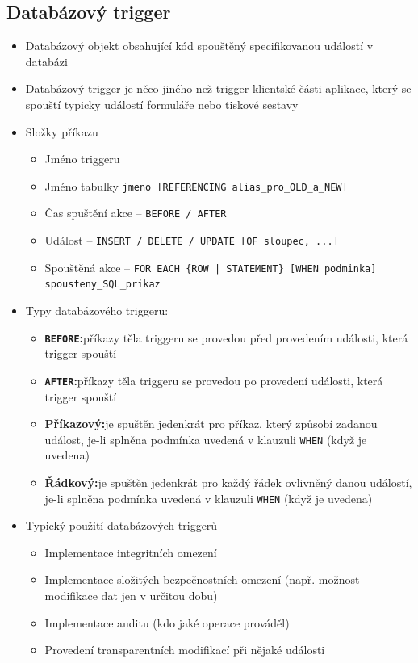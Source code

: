 \documentclass[a4paper,10pt]{article}
\newcommand{\pojem}[2]{\item \textbf{#1:}\quad #2}
\begin{document}
		\subsection{Databázový trigger}
			\begin{itemize}
				\item Databázový objekt obsahující kód spouštěný specifikovanou událostí v databázi
				\item Databázový trigger je něco jiného než trigger klientské části aplikace, který se spouští typicky událostí formuláře nebo tiskové sestavy
				\item Složky příkazu
				\begin{itemize}
					\item Jméno triggeru
					\item Jméno tabulky \texttt{jmeno [REFERENCING alias\_pro\_OLD\_a\_NEW]}
					\item Čas spuštění akce -- \texttt{BEFORE / AFTER}
					\item Událost -- \texttt{INSERT / DELETE / UPDATE [OF sloupec, ...]}
					\item Spouštěná akce -- \texttt{FOR EACH \{ROW | STATEMENT\} [WHEN podminka] spousteny\_SQL\_prikaz}
				\end{itemize}
				\item Typy databázového triggeru:
				\begin{itemize}
					\pojem{\texttt{BEFORE}}{příkazy těla triggeru se provedou před provedením události, která trigger spouští}
					\pojem{\texttt{AFTER}}{příkazy těla triggeru se provedou po provedení události, která trigger spouští}
					\pojem{Příkazový}{je spuštěn jedenkrát pro příkaz, který způsobí zadanou událost, je-li splněna podmínka uvedená v klauzuli \texttt{WHEN} (když je uvedena)}
					\pojem{Řádkový}{je spuštěn jedenkrát pro každý řádek ovlivněný danou událostí, je-li splněna podmínka uvedená v klauzuli \texttt{WHEN} (když je uvedena)}
				\end{itemize}
				\item Typický použití databázových triggerů
				\begin{itemize}
					\item Implementace integritních omezení
					\item Implementace složitých bezpečnostních omezení (např. možnost modifikace dat jen v určitou dobu)
					\item Implementace auditu (kdo jaké operace prováděl)
					\item Provedení transparentních modifikací při nějaké události

\end{itemize}
\end{itemize}
\end{document}
